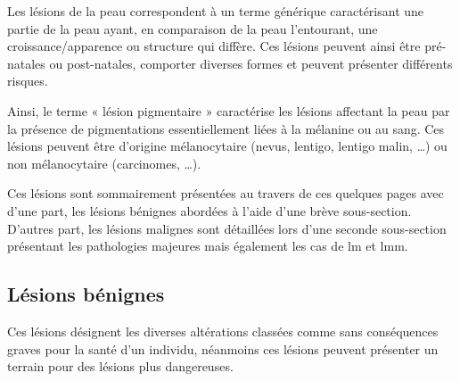 Les lésions de la peau correspondent à un terme générique caractérisant une partie de la peau ayant, en comparaison de la peau l’entourant, une croissance/apparence ou structure qui diffère. Ces lésions peuvent ainsi être pré-natales ou post-natales, comporter diverses formes et peuvent présenter différents risques.\par

Ainsi, le terme « lésion pigmentaire » caractérise les lésions affectant la peau par la présence de pigmentations essentiellement liées à la mélanine ou au sang. Ces lésions peuvent être d’origine mélanocytaire (nevus, lentigo, lentigo malin, \ldots) ou non mélanocytaire (carcinomes, \ldots).\par

Ces lésions sont sommairement présentées au travers de ces quelques pages avec d'une part, les lésions bénignes abordées à l'aide d'une brève sous-section. D'autres part, les lésions malignes sont détaillées lors d'une seconde sous-section présentant les pathologies majeures mais également les cas de \acrlong{lm} et \acrlong{lmm}.\par

\subsection{Lésions bénignes}
Ces lésions désignent les diverses altérations classées comme sans conséquences graves pour la santé d'un individu, néanmoins ces lésions peuvent présenter un terrain pour des lésions plus dangereuses.\par

